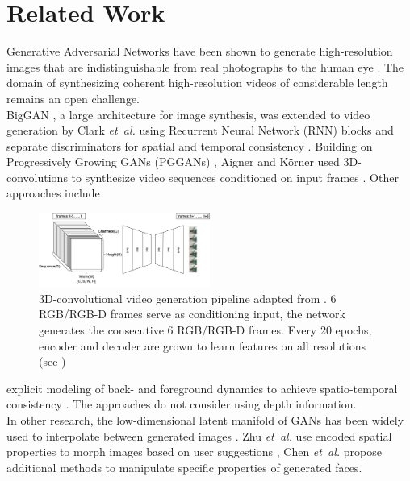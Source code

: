 \documentclass[10pt,twocolumn,letterpaper]{article}
\begin{document}
\section{Related Work}
Generative Adversarial Networks have been shown to generate high-resolution images that are indistinguishable from real photographs to the human eye \cite{Karras2018a, Karras2018}. The domain of synthesizing coherent high-resolution videos of considerable length remains an open challenge.\\%
BigGAN \cite{Brock2018}, a large architecture for image synthesis, was extended to video generation by Clark {\em et\ al.} using Recurrent Neural Network (RNN) blocks and separate discriminators for spatial and temporal consistency \cite{Clark2019}. 
Building on Progressively Growing GANs (PGGANs) \cite{Karras2018}, Aigner and K\"orner used 3D-convolutions to synthesize video sequences conditioned on input frames \cite{Aigner2019}. Other approaches include 
\begin{figure}[H]
	\centering
	\includegraphics[width=0.5\textwidth]{graphics/FutureGAN/FutureGAN.png}
	\caption{3D-convolutional video generation pipeline adapted from \cite{Aigner2019}. 6 RGB/RGB-D frames serve as conditioning input, the network generates the consecutive 6 RGB/RGB-D frames. Every 20 epochs, encoder and decoder are grown to learn features on all resolutions (see \cite{Karras2018})}
	\label{fig:futuregan}
\end{figure}
explicit modeling of back- and foreground dynamics to achieve spatio-temporal consistency \cite{Vondrick2016}. The approaches do not consider using depth information. \\
In other research, the low-dimensional latent manifold of GANs has been widely used to interpolate between generated images \cite{Karras2018}. Zhu {\em et\ al.} use encoded spatial properties to morph images based on user suggestions \cite{Zhu2016}, Chen {\em et\ al.} \cite{Chen2019} propose additional methods to manipulate specific properties of generated faces.
\end{document}
